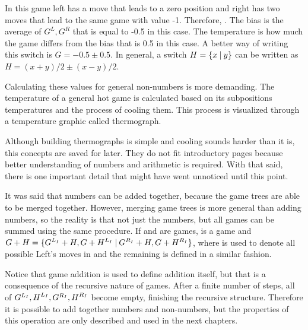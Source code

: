 In this game left has a move that leads to a zero position and right has two moves that lead to the same game with value -1. Therefore, . The bias is the average of $G^L, G^R$ that is equal to -0.5 in this case. The temperature is how much the game differs from the bias that is 0.5 in this case. A better way of writing this switch is $G = -0.5 \pm 0.5$. In general, a switch $H = \mbox{$\{x\:|\:y\}$}$ can be written as $H = (x+y)/2 \pm (x-y)/2$. 

Calculating these values for general non-numbers is more demanding. The temperature of a general hot game is calculated based on its subpositions temperatures and the process of cooling them. This process is visualized through a temperature graphic called thermograph.

Although building thermographs is simple and cooling sounds harder than it is, this concepts are saved for later. They do not fit introductory pages because better understanding of numbers and arithmetic is required. With that said, there is one important detail that might have went unnoticed until this point.

It was said that numbers can be added together, because the game trees are able to be merged together. However, merging game trees is more general than adding numbers, so the reality is that not just the numbers, but all games can be summed using the same procedure. If \Gm{} and \Hm are games, \Gm{ + \Hm} is a game and $\mbox{$G + \mbox{$H$} = \mbox{$\{G^{L_I}+H, G+H^{L_I}\:|\:G^{R_I}+H, G+H^{R_I}\}$}$}$, where  is used to denote all possible Left's moves in \Gm{} and the remaining is defined in a similar fashion.

Notice that game addition is used to define addition itself, but that is a consequence of the recursive nature of games. After a finite number of steps, all of $\mbox{$G^{L_I}$}, \mbox{$H$}^{L_I}, \mbox{$G^{R_I}$}, \mbox{$H$}^{R_I}$ become empty, finishing the recursive structure. Therefore it is possible to add together numbers and non-numbers, but the properties of this operation are only described and used in the next chapters.







